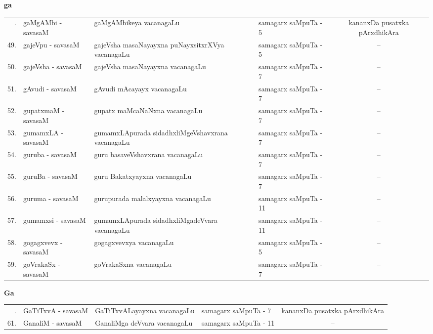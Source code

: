 \centerline{\bf ga}
\medskip

{\renewcommand{\arraystretch}{1.35}
\begin{longtable}{rl>{\raggedright}p{5.5cm}lc}
\endfirsthead
\endhead
\endfoot
\endlastfoot
48. &  gaMgAMbi - savasaM & gaMgAMbikeya vacanagaLu & samagarx saMpuTa - 5  & kananxDa pusatxka pArxdhikAra\\
49. &  gajeVpu - savasaM & gajeVsha masaNayayxna puNayxsitxrXVya vacanagaLu & samagarx saMpuTa - 5 & --\\
50. &  gajeVsha - savasaM & gajeVsha masaNayayxna vacanagaLu & samagarx saMpuTa - 7 & --\\
51. &  gAvudi - savasaM &  gAvudi mAcayayx vacanagaLu & samagarx saMpuTa - 7 & --\\
52. &  gupatxmaM - savasaM & gupatx maMcaNaNxna vacanagaLu & samagarx saMpuTa - 7 & --\\
53. &  gumamxLA - savasaM & gumamxLApurada sidadhxliMgeVshavxrana\newline \phantom{AA} vacanagaLu & samagarx saMpuTa - 7 & --\\
54. &  guruba - savasaM & guru basaveVshavxrana vacanagaLu & samagarx saMpuTa - 7 & --\\
55. &  guruBa - savasaM & guru Bakatxyayxna vacanagaLu & samagarx saMpuTa - 7 & --\\
56. &  guruma - savasaM & gurupurada malalxyayxna vacanagaLu & samagarx saMpuTa - 11 & --\\
57. &  gumamxsi - savasaM & gumamxLApurada sidadhxliMgadeVvara\newline \phantom{AA} vacanagaLu & samagarx saMpuTa - 11 & --\\
58. & gogagxvevx  - savasaM & gogagxvevxya vacanagaLu & samagarx saMpuTa - 5 & --\\
59. &  goVrakaSx - savasaM & goVrakaSxna vacanagaLu & samagarx saMpuTa - 7 & --\\
\end{longtable}}

\medskip

\centerline{\bf Ga}

{\renewcommand{\arraystretch}{1.32}
\begin{longtable}{rl>{\raggedright}p{5.5cm}lc}
\endfirsthead
\endhead
\endfoot
\endlastfoot
60. &  GaTiTxvA - savasaM & GaTiTxvALayayxna vacanagaLu & samagarx saMpuTa - 7 & kananxDa pusatxka pArxdhikAra\\
61. &  GanaliM - savasaM & GanaliMga deVvara vacanagaLu & samagarx saMpuTa - 11  & --\\
\end{longtable}}

